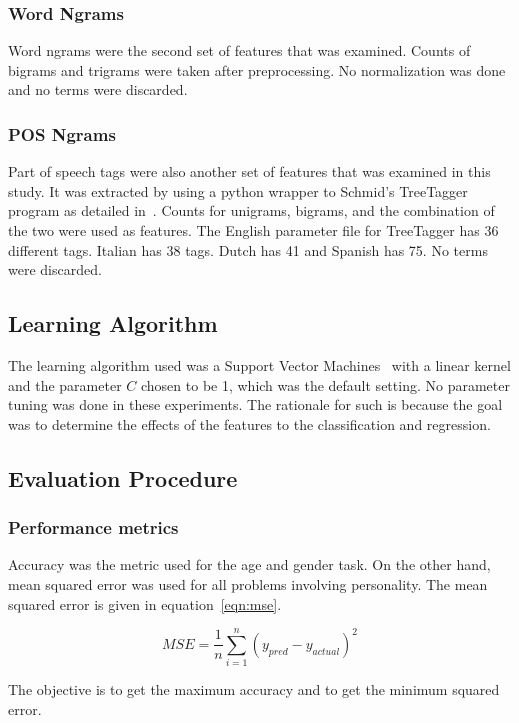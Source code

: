 \documentclass[a4paper]{llncs}
\begin{document}
\subsubsection{Word Ngrams}
Word ngrams were the second set of features that was examined. Counts of bigrams and trigrams were taken after preprocessing. No normalization was done and no terms were discarded. 

\subsubsection{POS Ngrams}
Part of speech tags were also another set of features that was examined in this study. It was extracted by using a python wrapper to Schmid's TreeTagger program as detailed in~\cite{schmid1994probabilistic}. Counts for unigrams, bigrams, and the combination of the two were used as features. The English parameter file for TreeTagger has 36 different tags. Italian has 38 tags. Dutch has 41 and Spanish has 75. No terms were discarded.

\subsection{Learning Algorithm}
The learning algorithm used was a Support Vector Machines~\cite{cortes1995support} with a linear kernel and the parameter $C$ chosen to be 1, which was the default setting. No parameter tuning was done in these experiments. The rationale for such is because the goal was to determine the effects of the features to the classification and regression.  

\subsection{Evaluation Procedure}
\subsubsection{Performance metrics}
Accuracy was the metric used for the age and gender task. On the other hand, mean squared error was used for all problems involving personality. The mean squared error is given in equation~\ref{eqn:mse}.

\begin{equation}
  MSE =\frac{1}{n} \sum_{i=1}^n \left( y_{pred}-y_{actual}\right)^2 
  \label{eqn:mse}
\end{equation}


The objective is to get the maximum accuracy and to get the minimum squared error. 
\end{document}
